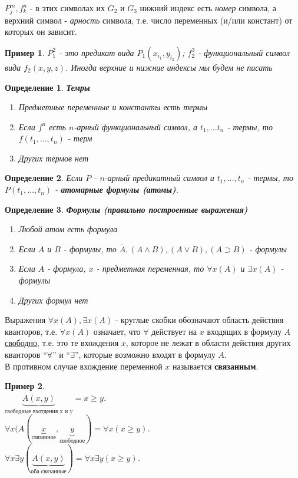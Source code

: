\documentclass{article}
\newtheorem{example}{Пример}
\newtheorem{definition}{Определение}
\numberwithin{example}{section}
\numberwithin{question}{section}
\numberwithin{Remark}{section}
\numberwithin{theorem}{section}
\numberwithin{definition}{section}
\numberwithin{proposition}{section}
\begin{document}
$P_j^m,f_k^n$ - в этих символах их $G_2$ и $G_3$ нижний индекс есть \emph{номер} символа, а верхний символ - \emph{арность} символа, т.е. число переменных (и/или констант) от которых он зависит.
\begin{example}
	$P_1^2$ - это предикат вида $P_1(x_{i_1},y_{i_2})$; $f^3_2$ - функциональный символ вида $f_2(x,y,z)$. Иногда верхние и нижние индексы мы будем не писать
\end{example}
\begin{definition}
	\textbf{Темры}
	\begin{enumerate}
		\item Предметные переменные и константы есть термы
		\item Если $f^n$ есть $n$-арный функциональный символ, а $t_1,\ldots t_n$ - термы, то $f(t_1,\ldots,t_n)$ - терм
		\item Других термов нет
	\end{enumerate}
\end{definition}
\begin{definition}
	Если $P$ - $n$-арный предикатный символ и $t_1,\ldots,t_n$ - термы, то $P(t_1,\ldots,t_n)$ - \textbf{атомарные формулы (атомы)}.  
\end{definition}
\begin{definition}
	\textbf{Формулы (правильно построенные выражения)}
	\begin{enumerate}
		\item Любой атом есть формула
		\item Если $A$ и $B$ - формулы, то $\bar{A},(A\wedge B),(A\vee B),(A\supset B)$ - формулы
		\item Если $A$ - формула, $x$ - предметная переменная, то $\forall x(A)$ и $\exists x(A)$ - формулы
		\item Других формул нет 
	\end{enumerate}
\end{definition}
	Выражения $\forall x(A),\exists x(A)$ - круглые скобки обозначают область действия кванторов, т.е. $\forall x(A)$ означает, что $\forall$ действует на $x$ входящих в формулу $A$ \underline{свободно}, т.е. это те вхождения $x$, которое не лежат в области действия других кванторов ``$\forall$'' и ``$\exists$'', которые возможно входят в формулу $A$.\\
	В противном случае вхождение переменной $x$ называется \textbf{связанным}.
	\begin{example}
		\text{}\\
		$\underbrace{A(x,y)}_{\text{свободные вхотдения x и y}} = x\ge y$.\\
		$\forall x(A(\underbrace{x}_{\text{связанное}},\underbrace{y}_{\text{свободное}})=\forall x(x\ge y)$.\\
		$\forall x \exists y(\underbrace{A(x,y)}_{\text{оба связанные}})=\forall x \exists y (x\ge y)$.
	\end{example}
\end{document}
